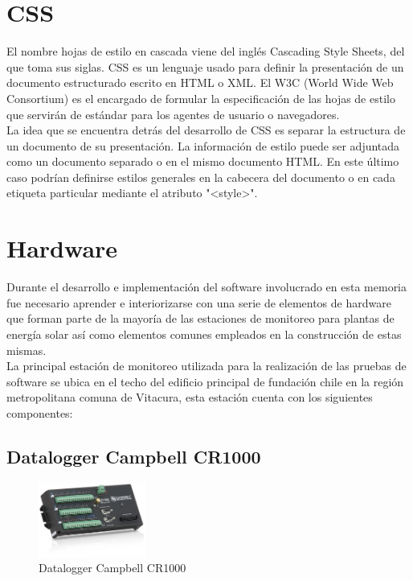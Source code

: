 \section{CSS}
El nombre hojas de estilo en cascada viene del inglés Cascading Style Sheets, del que toma sus siglas. CSS es un lenguaje usado para definir la presentación de un documento estructurado escrito en HTML o XML. El W3C (World Wide Web Consortium) es el encargado de formular la especificación de las hojas de estilo que servirán de estándar para los agentes de usuario o navegadores.\\

La idea que se encuentra detrás del desarrollo de CSS es separar la estructura de un documento de su presentación.
La información de estilo puede ser adjuntada como un documento separado o en el mismo documento HTML. En este último caso podrían definirse estilos generales en la cabecera del documento o en cada etiqueta particular mediante el atributo "<style>".

\section{Hardware}
Durante el desarrollo e implementación del software involucrado en esta memoria fue necesario aprender e interiorizarse con una serie de elementos de hardware que forman parte de la mayoría de las estaciones de monitoreo para plantas de energía solar así como elementos comunes empleados en la construcción de estas mismas.\\

La principal estación de monitoreo utilizada para la realización de las pruebas de software se ubica en el techo del edificio principal de fundación chile en la región metropolitana comuna de Vitacura, esta estación cuenta con los siguientes componentes:

\subsection{Datalogger Campbell CR1000}
\begin{figure}[h!]
	\centering
	\includegraphics[width=100pt]{images/cr1000}
	\caption{Datalogger Campbell CR1000}
\end{figure}
 
